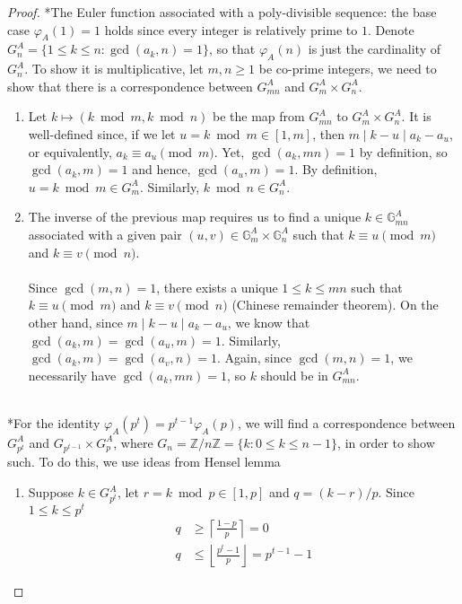 \documentclass{article}
\theoremstyle{definition}
\begin{document}
\begin{proof}*The Euler function associated with a poly-divisible sequence: the base case $\varphi_A (1) = 1$ holds since every integer is relatively prime to $1$. Denote $G_n^A = \{ 1 \leq k \leq n : \gcd(a_k, n) = 1 \}$, so that $\varphi_A (n)$ is just the cardinality of $G_n^A$. To show it is multiplicative, let $m, n \geq 1$ be co-prime integers, we need to show that there is a correspondence between $G_{mn}^A$ and $G_m^A \times G_n^A$.
\begin{enumerate}
	\item Let $k \mapsto (k \bmod{m}, k \bmod{n})$ be the map from $G_{mn}^A$ to $G_m^A \times G_n^A$. It is well-defined since, if we let $u = k \bmod{m} \in [1, m]$, then $m \mid k - u \mid a_k - a_u$, or equivalently, $a_k \equiv a_u \pmod{m}$. Yet, $\gcd(a_k, mn) = 1$ by definition, so $\gcd(a_k, m) = 1$ and hence, $\gcd(a_u, m) = 1$. By definition, $u = k \bmod{m} \in G_m^A$. Similarly, $k \bmod{n} \in G_n^A$.
	\item The inverse of the previous map requires us to find a unique $k \in \mathbb{G}_{mn}^A$ associated with a given pair $(u, v) \in \mathbb{G}_m^A \times \mathbb{G}_n^A$ such that $k \equiv u \pmod{m}$ and $k \equiv v \pmod{n}$.
	\\
	\\
	Since $\gcd(m, n) = 1$, there exists a unique $1 \leq k \leq mn$ such that $k \equiv u \pmod{m}$ and $k \equiv v \pmod{n}$ (Chinese remainder theorem). On the other hand, since $m \mid k - u \mid a_k - a_u$, we know that $\gcd(a_k, m) = \gcd(a_u, m) = 1$. Similarly, $\gcd(a_k, m) = \gcd(a_v, n) = 1$. Again, since $\gcd(m, n) = 1$, we necessarily have $\gcd(a_k, mn) = 1$, so $k$ should be in $G_{mn}^A$.
\end{enumerate}
\ \\
*For the identity $\varphi_A (p^t) = p^{t - 1} \varphi_A (p)$, we will find a correspondence between $G^A_{p^t}$ and $G_{p^{t - 1}} \times G^A_{p}$, where $G_n = \mathbb{Z}/n \mathbb{Z} = \{ k : 0 \leq k \leq n - 1 \}$, in order to show such. To do this, we use ideas from Hensel lemma
\begin{enumerate}
	\item Suppose $k \in G^A_{p^t}$, let $r = k \bmod{p} \in [1, p]$ and $q = (k - r)/p$. Since $1 \leq k \leq p^t$
	\begin{align*}
	q & \geq \left\lceil \frac{1 - p}{p} \right\rceil = 0 \\
	q & \leq \left\lfloor \frac{p^t - 1}{p} \right\rfloor = p^{t - 1} - 1
	\end{align*}

\end{enumerate}
\end{proof}
\end{document}
